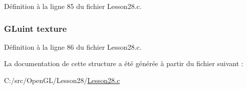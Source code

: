 Définition à la ligne 85 du fichier Lesson28.\+c.

\hypertarget{structbpatch_a0704dfe56dec926cb35f7bdc0834ecd0}{}
\subsubsection[{texture}]{\setlength{\rightskip}{0pt plus 5cm}G\+Luint texture}\label{structbpatch_a0704dfe56dec926cb35f7bdc0834ecd0}


Définition à la ligne 86 du fichier Lesson28.\+c.



La documentation de cette structure a été générée à partir du fichier suivant \+:\begin{DoxyCompactItemize}
\item 
C\+:/src/\+Open\+G\+L/\+Lesson28/\hyperlink{_lesson28_8c}{Lesson28.\+c}\end{DoxyCompactItemize}
